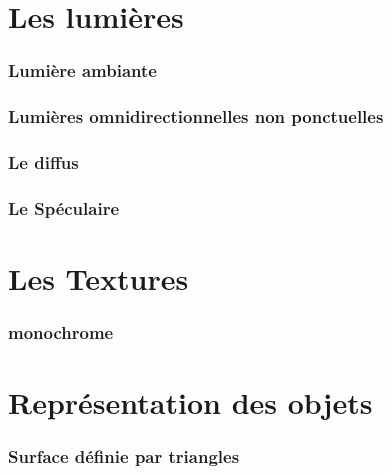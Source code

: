 \documentclass[fontsize=10pt, twoside=no]{scrartcl} %
\begin{document}
\part{Les lumières}

    \section{Lumière ambiante}
    
    \section{Lumières omnidirectionnelles non ponctuelles}

    \section{Le diffus}

    \section{Le Spéculaire}

\part{Les Textures}

    \section{monochrome}

\part{Représentation des objets}

    \section{Surface définie par triangles}
    
\end{document}
